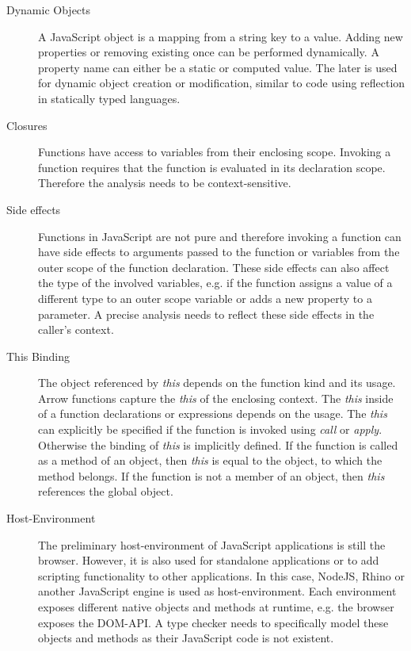 \begin{description}
	\item[Dynamic Objects] A JavaScript object is a mapping from a string key to a value. Adding new properties or removing existing once can be performed dynamically. A property name can either be a static or computed value. The later is used for dynamic object creation or modification, similar to code using reflection in statically typed languages. 
	
	\item[Closures] Functions have access to variables from their enclosing scope. Invoking a function requires that the function is evaluated in its declaration scope. Therefore the analysis needs to be context-sensitive.

	\item[Side effects] Functions in JavaScript are not pure and therefore invoking a function can have side effects to arguments passed to the function or variables from the outer scope of the function declaration. These side effects can also affect the type of the involved variables, e.g. if the function assigns a value of a different type to an outer scope variable or adds a new property to a parameter. A precise analysis needs to reflect these side effects in the caller's context.
	
	\item[This Binding] The object referenced by \textit{this} depends on the  function kind and its usage. Arrow functions capture the \textit{this} of the enclosing context. The \textit{this} inside of a function declarations or expressions depends on the usage. The \textit{this} can explicitly be specified if the function is invoked using \textit{call} or \textit{apply}. Otherwise the binding of \textit{this} is implicitly defined. If the function is called as a method of an object, then \textit{this} is equal to the object, to which the method belongs. If the function is not a member of an object, then \textit{this} references the global object. 

	\item[Host-Environment] The preliminary host-environment of JavaScript applications is still the browser. However, it is also used for standalone applications or to add scripting functionality to other applications. In this case, NodeJS, Rhino or another JavaScript engine is used as host-environment. Each environment exposes different native objects and methods at runtime, e.g. the browser exposes the DOM-API. A type checker needs to specifically model these objects and methods as their JavaScript code is not existent.
\end{description}

